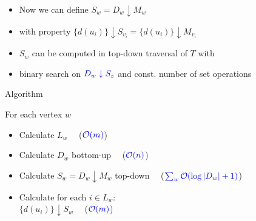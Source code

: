 \documentclass[18pt]{beamer}
\begin{document}
\begin{frame}
\begin{overprint}
	 		\begin{itemize}
	 			\item Now we can define $S_w = D_w \downarrow M_w$
	 			\item with property $\{d(u_i)\} \downarrow S_{v_i} = \{d(u{_i})\} \downarrow M_{v_i}$
 				\item $S_w$ can be computed in {\color{blue}top-down} traversal of $T$ with
 				\item {\color{blue} binary search} on $\color{blue} D_w \downarrow S_z$ and const. number of set operations
	 		\end{itemize}
     \end{overprint}     
		
\end{frame}
\begin{frame}{Algorithm}
    \begin{minipage}[t]{0.49\textwidth}
    	
    	For each vertex $w$ 
    	\begin{itemize}
    		\item Calculate $L_w$   \ \ ($\color{blue}\mathcal{O}(m)$)
    		\item Calculate $D_w$ bottom-up \ \ ($\color{blue}\mathcal{O}(n)$)
    		\item Calculate $S_w = D_w \downarrow M_w$ top-down  \ \ ($\color{blue}\sum_{w} \mathcal{O}(\log|D_w| + 1)$)
    		\item Calculate for each $i \in L_w$: \\
    			  $\{d(u_i)\} \downarrow S_w$ \ \ ($\color{blue} \mathcal{O}(m)$)
    		

\end{itemize}
\end{minipage}
\end{frame}
\end{document}
